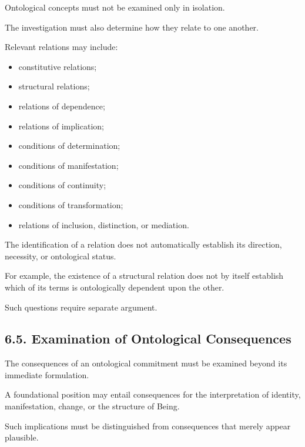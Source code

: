 Ontological concepts must not be
examined only in isolation.

The investigation must also determine
how they relate to one another.

Relevant relations may include:

\begin{itemize}

    \item constitutive relations;

    \item structural relations;

    \item relations of dependence;

    \item relations of implication;

    \item conditions of determination;

    \item conditions of manifestation;

    \item conditions of continuity;

    \item conditions of transformation;

    \item relations of inclusion,
    distinction, or mediation.

\end{itemize}

The identification of a relation does
not automatically establish its
direction, necessity, or ontological
status.

For example, the existence of a
structural relation does not by
itself establish which of its terms
is ontologically dependent upon
the other.

Such questions require separate
argument.

\subsection*{6.5. Examination of Ontological Consequences}

The consequences of an ontological
commitment must be examined beyond
its immediate formulation.

A foundational position may entail
consequences for the interpretation
of identity, manifestation, change,
or the structure of Being.

Such implications must be distinguished
from consequences that merely appear
plausible.

